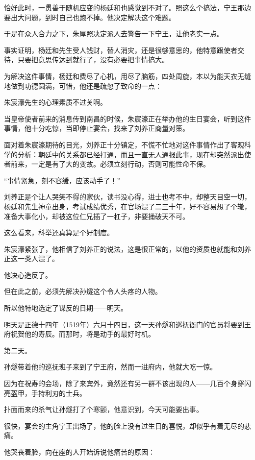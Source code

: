 \begin{multicols}{\theparacolNo}
		恰好此时，一贯善于随机应变的杨廷和也感觉到不对了。照这么个搞法，宁王那边要出大问题，到时自己也跑不掉。他决定解决这个难题。

		于是在众人合力之下，朱厚照决定派人去警告一下宁王，让他老实一点。

		事实证明，杨廷和先生受人钱财，替人消灾，还是很够意思的，他特意跟使者交待，只要把意思传达到就行了，没有必要把事情搞大。

		为解决这件事情，杨廷和费尽了心机，用尽了脑筋，四处周旋，本以为能天衣无缝地做到功德圆满，可惜，他还是疏忽了致命的一点：

		朱宸濠先生的心理素质不过关啊。

		当皇帝使者前来的消息传到南昌的时候，朱宸濠正在举办他的生日宴会，听到这件事情，他十分吃惊，当即停止宴会，找来了刘养正商量对策。

		面对着朱宸濠期待的目光，刘养正十分镇定，不慌不忙地对这件事情作出了客观科学的分析：朝廷中的关系都已经打通，而且一直无人通报此事，现在却突然派出使者前来，一定是有了大的变故。必须立刻行动，否则可能性命不保。

		“事情紧急，刻不容缓，应该动手了！”

		刘养正是个让人哭笑不得的家伙，读书没心得，进士也考不中，却整天目空一切，杨廷和先生神童出身，考试成绩优秀，在官场混了二三十年，好不容易想了个辙，准备大事化小，却被这位仁兄插了一杠子，非要捅破天不可。

		这么看来，科举还真算是个好制度。

		朱宸濠紧张了，他相信了刘养正的说法，这是很正常的，以他的资质也就能和刘养正这一类人混了。

		他决心造反了。

		但在此之前，必须先解决孙燧这个令人头疼的人物。

		所以他特地选定了谋反的日期——明天。

		明天是正德十四年（1519年）六月十四日，这一天孙燧和巡抚衙门的官员将要到王府祝贺他的寿辰。而那时，将是动手的最好时机。

		第二天。

		孙燧带着他的巡抚班子来到了宁王府，然而一进府内，他就大吃一惊。

		因为在祝寿的会场，除了来宾外，竟然还有另一群不该出现的人——几百个身穿闪亮盔甲，手持利刃的士兵。

		扑面而来的杀气让孙燧打了个寒颤，他意识到，今天可能要出事。

		很快，宴会的主角宁王出场了，他的脸上没有过生日的喜悦，却似乎有着无尽的悲痛。

		他哭丧着脸，向在座的人开始诉说他痛苦的原因：


\end{multicols}
